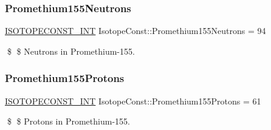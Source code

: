 \subsubsection{\texorpdfstring{Promethium155\+Neutrons}{Promethium155Neutrons}}
{\footnotesize\ttfamily \mbox{\hyperlink{group___isotope_const-_macros_ga5f18360b3e99483a35c32d789e62621c}{I\+S\+O\+T\+O\+P\+E\+C\+O\+N\+S\+T\+\_\+\+I\+NT}} Isotope\+Const\+::\+Promethium155\+Neutrons = 94}

\$ \$ Neutrons in Promethium-\/155. \mbox{\label{group___isotope_const-_promethium-_pm155_gae672f00dd0c76a309d0f17f1df9eac30}} 
\subsubsection{\texorpdfstring{Promethium155\+Protons}{Promethium155Protons}}
{\footnotesize\ttfamily \mbox{\hyperlink{group___isotope_const-_macros_ga5f18360b3e99483a35c32d789e62621c}{I\+S\+O\+T\+O\+P\+E\+C\+O\+N\+S\+T\+\_\+\+I\+NT}} Isotope\+Const\+::\+Promethium155\+Protons = 61}

\$ \$ Protons in Promethium-\/155. 
